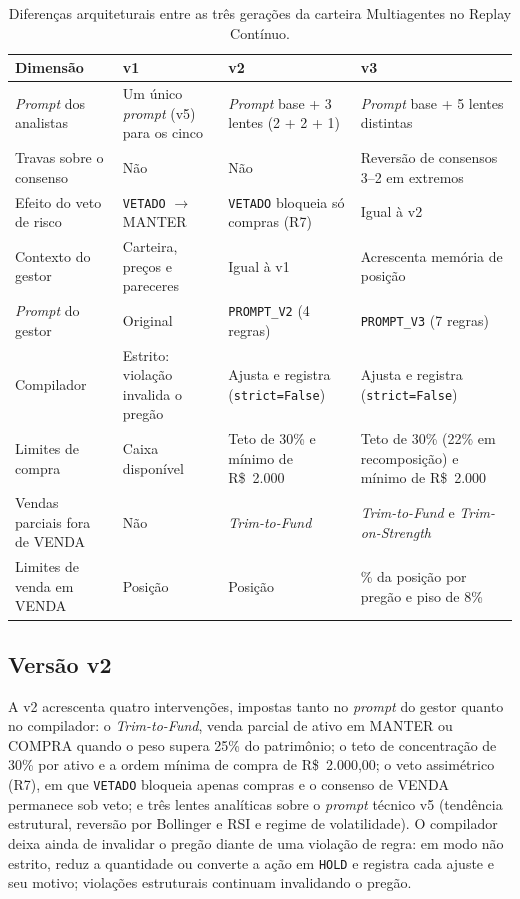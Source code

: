 \begin{table}[htbp]
\centering
\caption{Diferenças arquiteturais entre as três gerações da carteira Multiagentes no Replay Contínuo.}
\label{tab:evolucao-versoes}
\small
\setlength{\tabcolsep}{4pt}
\begin{tabular}{>{\raggedright\arraybackslash}p{3.0cm} >{\raggedright\arraybackslash}p{3.8cm} >{\raggedright\arraybackslash}p{3.8cm} >{\raggedright\arraybackslash}p{4.0cm}}
\toprule
\textbf{Dimensão} & \textbf{v1} & \textbf{v2} & \textbf{v3} \\
\midrule
\textit{Prompt} dos analistas & Um único \textit{prompt} (v5) para os cinco & \textit{Prompt} base + 3 lentes (2 + 2 + 1) & \textit{Prompt} base + 5 lentes distintas \\
Travas sobre o consenso & Não & Não & Reversão de consensos 3--2 em extremos \\
Efeito do veto de risco & \texttt{VETADO} $\rightarrow$ MANTER & \texttt{VETADO} bloqueia só compras (R7) & Igual à v2 \\
Contexto do gestor & Carteira, preços e pareceres & Igual à v1 & Acrescenta memória de posição \\
\textit{Prompt} do gestor & Original & \texttt{PROMPT\_V2} (4 regras) & \texttt{PROMPT\_V3} (7 regras) \\
Compilador & Estrito: violação invalida o pregão & Ajusta e registra (\texttt{strict=False}) & Ajusta e registra (\texttt{strict=False}) \\
Limites de compra & Caixa disponível & Teto de 30\% e mínimo de R\$~2.000 & Teto de 30\% (22\% em recomposição) e mínimo de R\$~2.000 \\
Vendas parciais fora de VENDA & Não & \textit{Trim-to-Fund} & \textit{Trim-to-Fund} e \textit{Trim-on-Strength} \\
Limites de venda em VENDA & Posição & Posição & 45\% da posição por pregão e piso de 8\% \\
\bottomrule
\end{tabular}
\end{table}

\subsection{Versão v2}

A v2 acrescenta quatro intervenções, impostas tanto no \textit{prompt} do gestor quanto no compilador: o \textit{Trim-to-Fund}, venda parcial de ativo em MANTER ou COMPRA quando o peso supera 25\% do patrimônio; o teto de concentração de 30\% por ativo e a ordem mínima de compra de R\$~2.000,00; o veto assimétrico (R7), em que \texttt{VETADO} bloqueia apenas compras e o consenso de VENDA permanece sob veto; e três lentes analíticas sobre o \textit{prompt} técnico v5 (tendência estrutural, reversão por Bollinger e RSI e regime de volatilidade). O compilador deixa ainda de invalidar o pregão diante de uma violação de regra: em modo não estrito, reduz a quantidade ou converte a ação em \texttt{HOLD} e registra cada ajuste e seu motivo; violações estruturais continuam invalidando o pregão.

